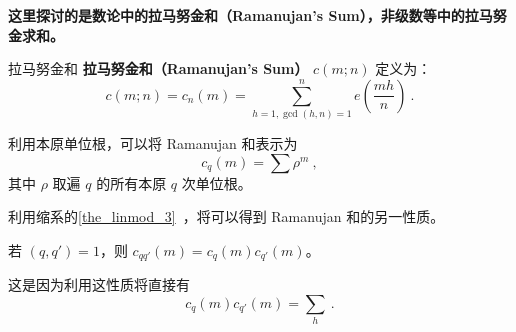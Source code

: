 

\textbf{这里探讨的是数论中的拉马努金和（Ramanujan's Sum），非级数等中的拉马努金求和。}

\begin{definition}{拉马努金和}
\textbf{拉马努金和（Ramanujan's Sum）} $c(m; n)$ 定义为：
\begin{equation}
c(m; n) = c_n(m) = \sum_{h=1, \gcd(h, n)=1}^{n} e\left(\frac{mh}{n}\right) ~.
\end{equation}
\end{definition}

\begin{theorem}{}
利用本原单位根，可以将 Ramanujan 和表示为
\begin{equation}
c_q(m) = \sum \rho^m~,
\end{equation}
其中 $\rho$ 取遍 $q$ 的所有本原 $q$ 次单位根。
\end{theorem}

利用缩系的\autoref{the_linmod_3}~，将可以得到 Ramanujan 和的另一性质。
\begin{theorem}{}
若 $(q, q') = 1$，则 $c_{qq'}(m) = c_q(m) c_{q'}(m)$。
\end{theorem}
这是因为利用这性质将直接有
\begin{equation}
c_q(m) c_{q'}(m) = \sum_{h} ~.
\end{equation}



